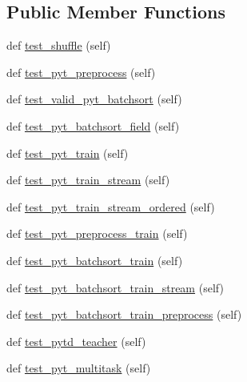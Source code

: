 \subsection*{Public Member Functions}
\begin{DoxyCompactItemize}
\item 
def \hyperlink{classtests_1_1test__pytorch__data__teacher_1_1TestPytorchDataTeacher_aaecd01e211d3e5b0c87f58da6c9b3def}{test\+\_\+shuffle} (self)
\item 
def \hyperlink{classtests_1_1test__pytorch__data__teacher_1_1TestPytorchDataTeacher_ad9d9065300215a4afeb0589192b5ba05}{test\+\_\+pyt\+\_\+preprocess} (self)
\item 
def \hyperlink{classtests_1_1test__pytorch__data__teacher_1_1TestPytorchDataTeacher_a2c83da3833b551a1e15e6cec4a8589eb}{test\+\_\+valid\+\_\+pyt\+\_\+batchsort} (self)
\item 
def \hyperlink{classtests_1_1test__pytorch__data__teacher_1_1TestPytorchDataTeacher_a1c96927436b550513d6656564ec0c5fe}{test\+\_\+pyt\+\_\+batchsort\+\_\+field} (self)
\item 
def \hyperlink{classtests_1_1test__pytorch__data__teacher_1_1TestPytorchDataTeacher_a4321d4b1619bf66a94146e811d869185}{test\+\_\+pyt\+\_\+train} (self)
\item 
def \hyperlink{classtests_1_1test__pytorch__data__teacher_1_1TestPytorchDataTeacher_a3d14342d0d8a931821b223111e383d8e}{test\+\_\+pyt\+\_\+train\+\_\+stream} (self)
\item 
def \hyperlink{classtests_1_1test__pytorch__data__teacher_1_1TestPytorchDataTeacher_a1ccb0839b1de7c220c5b53e73d4f9ae1}{test\+\_\+pyt\+\_\+train\+\_\+stream\+\_\+ordered} (self)
\item 
def \hyperlink{classtests_1_1test__pytorch__data__teacher_1_1TestPytorchDataTeacher_a3ba46374c7e9068827af1b90f35c832e}{test\+\_\+pyt\+\_\+preprocess\+\_\+train} (self)
\item 
def \hyperlink{classtests_1_1test__pytorch__data__teacher_1_1TestPytorchDataTeacher_a17540e666ded187d76960e3ef3f43d7b}{test\+\_\+pyt\+\_\+batchsort\+\_\+train} (self)
\item 
def \hyperlink{classtests_1_1test__pytorch__data__teacher_1_1TestPytorchDataTeacher_a5db5cdee08adaaf60c646c7c884f1068}{test\+\_\+pyt\+\_\+batchsort\+\_\+train\+\_\+stream} (self)
\item 
def \hyperlink{classtests_1_1test__pytorch__data__teacher_1_1TestPytorchDataTeacher_acf2428b3226bc0cf95d4dbb80877e6d0}{test\+\_\+pyt\+\_\+batchsort\+\_\+train\+\_\+preprocess} (self)
\item 
def \hyperlink{classtests_1_1test__pytorch__data__teacher_1_1TestPytorchDataTeacher_a3ff18909bd05956b4fa7970bc3c96afb}{test\+\_\+pytd\+\_\+teacher} (self)
\item 
def \hyperlink{classtests_1_1test__pytorch__data__teacher_1_1TestPytorchDataTeacher_a7337dfde736431a6c52de772c5230617}{test\+\_\+pyt\+\_\+multitask} (self)
\end{DoxyCompactItemize}


